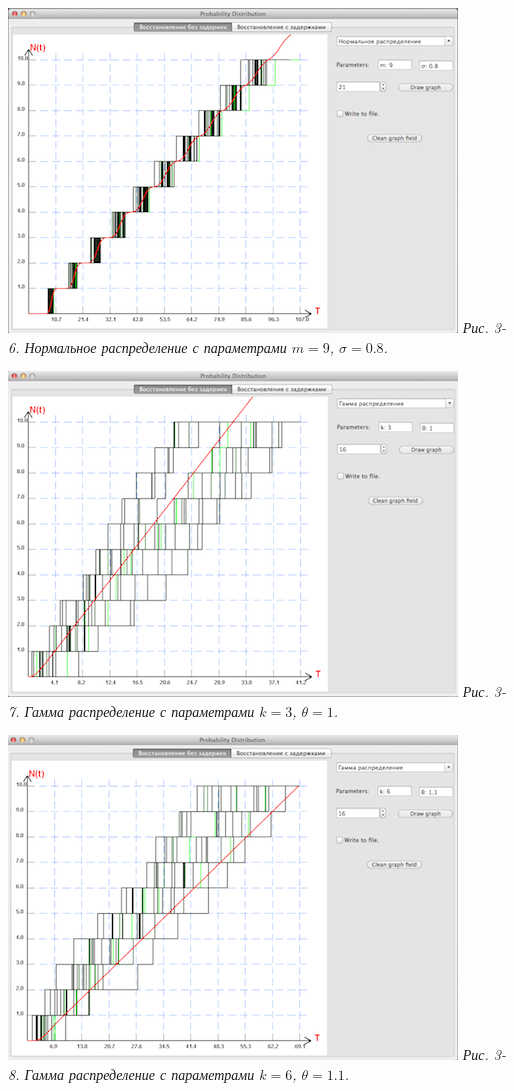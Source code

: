 \includegraphics{3-6.png} 
\textit{Рис. 3-6. Нормальное распределение с параметрами $m = 9$, $\sigma = 0.8$.}

\includegraphics{3-7.png} 
\textit{Рис. 3-7. Гамма распределение с параметрами $k = 3$, $\theta = 1$.}

\includegraphics{3-8.png} 
\textit{Рис. 3-8. Гамма распределение с параметрами $k = 6$, $\theta = 1.1$.}

